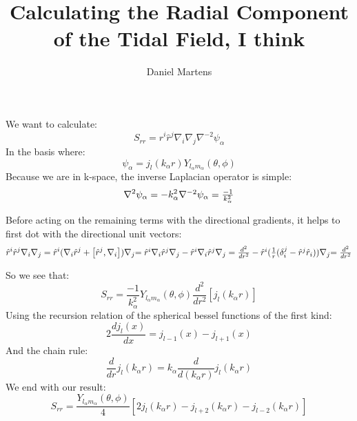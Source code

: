 \documentclass[11pt, oneside]{article}   	%
\title{Calculating the Radial Component of the Tidal Field, I think}
\author{Daniel Martens}
\begin{document}
\maketitle


We want to calculate:
\begin{equation}
S_{r r} = \hat{r}^{i} \hat{r}^{j} \nabla_{i} \nabla_{j} \nabla^{-2} \psi_{\alpha}
\end{equation}
In the basis where:
\begin{equation}
\psi_{\alpha} = j_{l}(k_{\alpha}r) Y_{l_{\alpha}m_{\alpha}}(\theta,\phi)
\end{equation}
Because we are in k-space, the inverse Laplacian operator is simple:
\begin{equation}
\nabla^{2}\psi_{\alpha} = -k_{\alpha}^{2}
$$
$$
\nabla^{-2}\psi_{\alpha} = \frac{-1}{k_{\alpha}^{2}}
\end{equation}

Before acting on the remaining terms with the directional gradients, it helps to first dot with the directional unit vectors:
\begin{equation}
\hat{r}^{i} \hat{r}^{j} \nabla_{i} \nabla_{j} = \hat{r}^{i} (  \nabla_{i} \hat{r}^{j} +\left[ \hat{r}^{j},\nabla_{i}\right] )\nabla_{j}
$$
$$
= \hat{r}^{i} \nabla_{i} \hat{r}^{j} \nabla_{j} - \hat{r}^{i} \nabla_{i} \hat{r}^{j} \nabla_{j} = \frac{d^{2}}{dr^{2}} - \hat{r}^{i}(\frac{1}{r}(\delta_{i}^{j} - \hat{r}^{j} \hat{r}_{i}))\nabla_{j}
$$
$$
= \frac{d^{2}}{dr^{2}}
\end{equation}


So we see that:
\begin{equation}
S_{rr} = \frac{-1}{k_{\alpha}^{2}} Y_{l_{\alpha}m_{\alpha}}(\theta,\phi) \frac{d^{2}}{dr^{2}} \left[j_{l}(k_{\alpha}r)  \right]
\end{equation}
Using the recursion relation of the spherical bessel functions of the first kind:
\begin{equation}
2 \frac{dj_{l}(x)}{dx} = j_{l-1}(x) - j_{l+1}(x)
\end{equation}
And the chain rule:
\begin{equation}
\frac{d}{dr}j_{l}(k_{\alpha}r) = k_{\alpha} \frac{d}{d(k_{\alpha}r)} j_{l}(k_{\alpha}r)
\end{equation}
We end with our result:
\begin{equation}
S_{r r} = \frac{Y_{l_{\alpha}m_{\alpha}}(\theta,\phi)}{4}\left[ 2 j_{l}(k_{\alpha}r) - j_{l+2}(k_{\alpha}r) - j_{l-2}(k_{\alpha}r) \right]
\end{equation}
\end{document}
